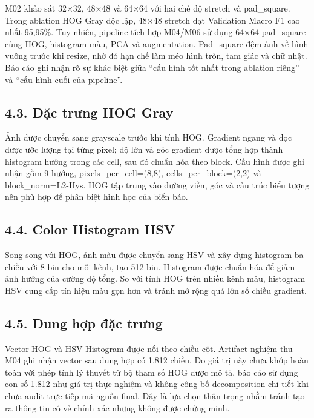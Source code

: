 \documentclass[12pt,a4paper]{article}
\begin{document}
M02 khảo sát 32×32, 48×48 và 64×64 với hai chế độ stretch và
pad\_square. Trong ablation HOG Gray độc lập, 48×48 stretch đạt
Validation Macro F1 cao nhất 95,95\%. Tuy nhiên, pipeline tích hợp
M04/M06 sử dụng 64×64 pad\_square cùng HOG, histogram màu, PCA và
augmentation. Pad\_square đệm ảnh về hình vuông trước khi resize, nhờ đó
hạn chế làm méo hình tròn, tam giác và chữ nhật. Báo cáo ghi nhận rõ sự
khác biệt giữa ``cấu hình tốt nhất trong ablation riêng'' và ``cấu hình
cuối của pipeline''.

\subsection{4.3. Đặc trưng HOG
Gray}\label{ux111ux1eb7c-trux1b0ng-hog-gray}

Ảnh được chuyển sang grayscale trước khi tính HOG. Gradient ngang và dọc
được ước lượng tại từng pixel; độ lớn và góc gradient được tổng hợp
thành histogram hướng trong các cell, sau đó chuẩn hóa theo block. Cấu
hình được ghi nhận gồm 9 hướng, pixels\_per\_cell=(8,8),
cells\_per\_block=(2,2) và block\_norm=L2-Hys. HOG tập trung vào đường
viền, góc và cấu trúc biểu tượng nên phù hợp để phân biệt hình học của
biển báo.

\subsection{4.4. Color Histogram HSV}\label{color-histogram-hsv}

Song song với HOG, ảnh màu được chuyển sang HSV và xây dựng histogram ba
chiều với 8 bin cho mỗi kênh, tạo 512 bin. Histogram được chuẩn hóa để
giảm ảnh hưởng của cường độ tổng. So với tính HOG trên nhiều kênh màu,
histogram HSV cung cấp tín hiệu màu gọn hơn và tránh mở rộng quá lớn số
chiều gradient.

\subsection{4.5. Dung hợp đặc
trưng}\label{dung-hux1ee3p-ux111ux1eb7c-trux1b0ng}

Vector HOG và HSV Histogram được nối theo chiều cột. Artifact nghiệm thu
M04 ghi nhận vector sau dung hợp có 1.812 chiều. Do giá trị này chưa
khớp hoàn toàn với phép tính lý thuyết từ bộ tham số HOG được mô tả, báo
cáo sử dụng con số 1.812 như giá trị thực nghiệm và không công bố
decomposition chi tiết khi chưa audit trực tiếp mã nguồn final. Đây là
lựa chọn thận trọng nhằm tránh tạo ra thông tin có vẻ chính xác nhưng
không được chứng minh.
\end{document}
